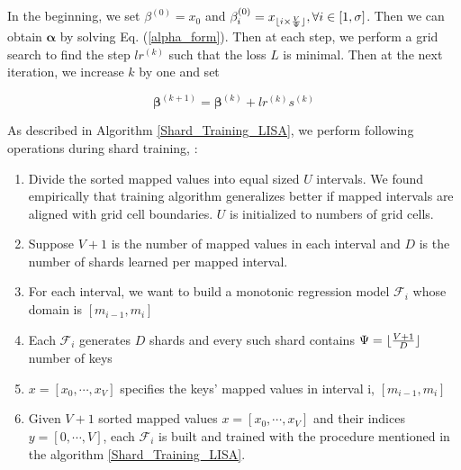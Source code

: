 In the beginning, we set $\beta^{(0)}=x_0$ and $\beta_i^{(0)}=x_{\lfloor i\times \frac{V}{\Psi}\rfloor}, \forall i\in[1,\sigma]$. Then we can obtain $\boldsymbol{\alpha}$ by solving Eq. (\ref{alpha_form}). Then at each step, we perform a grid search to find the step $lr^{(k)}$ such that the loss $L$ is minimal. Then at the next iteration, we increase $k$ by one and set 

$$
\boldsymbol{\beta}^{(k+1)}=\boldsymbol{\beta}^{(k)} + lr^{(k)}s^{(k)}
$$

As described in Algorithm \ref{Shard_Training_LISA}, we perform  following operations during shard training, :

\begin{enumerate}
	\item Divide the sorted mapped values into equal sized $U$ intervals. We found empirically that training algorithm generalizes better if mapped intervals are aligned with grid cell boundaries. $U$ is initialized to numbers of grid cells. 
	\item Suppose $V +1$ is the number of mapped values in each interval and $D$ is the  number of shards learned per mapped interval.
	\item For each interval, we want to build a monotonic regression
    model $ \mathcal {F}_{i}$ whose domain is $[m_{i-1},m_{i}]$ 
 
 	\item Each $\mathcal{F}_{i}$ generates $D$ shards and every such shard contains $\Psi = \lfloor\frac{V+1}{D}\rfloor$ number of keys 
    
    \item $x =[x_0,\cdots, x_V] $ specifies the keys' mapped values in interval i, $[m_{i-1},m_{i}]$ 
    
    \item Given $V +1$ sorted mapped values $x =[x_0,\cdots, x_V]$ and their indices $y =[0,\cdots, V]$, each $\mathcal{F}_{i}$ is built and trained with the procedure mentioned in the algorithm \ref{Shard_Training_LISA}.
    

\end{enumerate}

